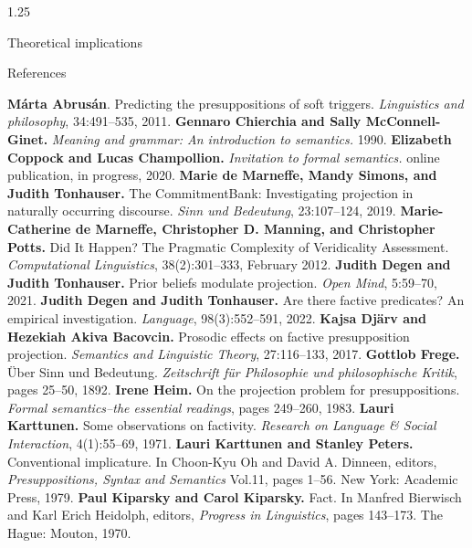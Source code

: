 \documentclass[final]{beamer}
\newlength{\colwidth}
\newlength{\vboxsep}
\begin{document}
\begin{frame}[t]
\begin{columns}[t]
\begin{column}{1.25\colwidth}
\begin{upshotbox}{Theoretical implications}
\begin{itemize}
				\end{itemize}
			\end{upshotbox}

			\vspace{\vboxsep}
			\begin{normalbox}{References}
				\tiny
				
				\textbf{Márta Abrusán}. Predicting the presuppositions of soft triggers. \textit{Linguistics and philosophy}, 34:491–535, 2011. \quad \textbullet \quad
				\textbf{Gennaro Chierchia and Sally McConnell-Ginet.} \textit{Meaning and grammar: An introduction to semantics.} 1990. \quad \textbullet \quad
				\textbf{Elizabeth Coppock and Lucas Champollion.} \textit{Invitation to formal semantics.} online publication, in progress, 2020. \quad \textbullet \quad
				\textbf{Marie de Marneffe, Mandy Simons, and Judith Tonhauser.} The CommitmentBank: Investigating projection in naturally occurring discourse. \textit{Sinn und Bedeutung}, 23:107–124, 2019. \quad \textbullet \quad
				\textbf{Marie-Catherine de Marneffe, Christopher D. Manning, and Christopher Potts.} Did It Happen? The Pragmatic Complexity of Veridicality Assessment. \textit{Computational Linguistics}, 38(2):301–333, February 2012. \quad \textbullet \quad
				\textbf{Judith Degen and Judith Tonhauser.} Prior beliefs modulate projection. \textit{Open Mind}, 5:59–70, 2021. \quad \textbullet \quad
				\textbf{Judith Degen and Judith Tonhauser.} Are there factive predicates? An empirical investigation. \textit{Language}, 98(3):552–591, 2022. \quad \textbullet \quad
				\textbf{Kajsa Djärv and Hezekiah Akiva Bacovcin.} Prosodic effects on factive presupposition projection. \textit{Semantics and Linguistic Theory}, 27:116–133, 2017. \quad \textbullet \quad
				\textbf{Gottlob Frege.} Über Sinn und Bedeutung. \textit{Zeitschrift für Philosophie und philosophische Kritik}, pages 25–50, 1892. \quad \textbullet \quad
				\textbf{Irene Heim.} On the projection problem for presuppositions. \textit{Formal semantics–the essential readings}, pages 249–260, 1983. \quad \textbullet \quad
				\textbf{Lauri Karttunen.} Some observations on factivity. \textit{Research on Language \& Social Interaction}, 4(1):55–69, 1971. \quad \textbullet \quad
				\textbf{Lauri Karttunen and Stanley Peters.} Conventional implicature. In Choon-Kyu Oh and David A. Dinneen, editors, \textit{Presuppositions, Syntax and Semantics} Vol.11, pages 1–56. New York: Academic Press, 1979. \quad \textbullet \quad
				\textbf{Paul Kiparsky and Carol Kiparsky.} Fact. In Manfred Bierwisch and Karl Erich Heidolph, editors, \textit{Progress in Linguistics}, pages 143–173. The Hague: Mouton, 1970. \quad \textbullet \quad

\end{normalbox}
\end{column}
\end{columns}
\end{frame}
\end{document}
